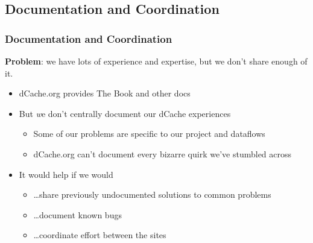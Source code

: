 \documentclass{beamer}
\begin{document}
\subsection{Documentation and Coordination}
\begin{frame}
\frametitle{Documentation and Coordination}
{\large {\bf Problem}: we have lots of experience and expertise, but we don't share enough of it.}
\vspace{1 cm}
\begin{itemize}
    \item dCache.org provides The Book and other docs
    \item But {\emph we} don't centrally document our dCache experiences
    \begin{itemize}
        \item Some of our problems are specific to our project and dataflows
        \item dCache.org can't document every bizarre quirk we've stumbled across
    \end{itemize}
    \item It would help if we would
    \begin{itemize}
        \item \dots{}share previously undocumented solutions to common problems
        \item \dots{}document known bugs
        \item \dots{}coordinate effort between the sites
    \end{itemize}
\end{itemize}
\end{frame}
\end{document}
